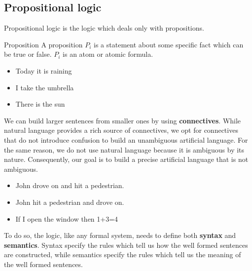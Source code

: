 \documentclass{article}
\begin{document}
\subsection{Propositional logic}
Propositional logic is the logic which deals only with propositions.
\begin{Definition}{Proposition}{}
    A proposition $P_i$ is a statement about some specific fact which can be true or
    false. $P_{i}$ is an atom or atomic formula.
\end{Definition}
\begin{example}
   \begin{itemize}
       \item Today it is raining
       \item I take the umbrella
       \item There is the sun
   \end{itemize}
\end{example}
We can build larger sentences from smaller ones by using \textbf{connectives}.
While natural language provides a rich source of connectives, we opt for
connectives that do not introduce confusion to build an unambiguous artificial
language. For the same reason, we do not use natural language because it is
ambiguous by its nature. Consequently, our goal is to build a precise
artificial language that is not ambiguous.
\begin{example}
    \begin{itemize}
        \item John drove on and hit a pedestrian.
        \item John hit a pedestrian and drove on.
        \item If I open the window then 1+3=4
    \end{itemize}
\end{example}
To do so, the logic, like any formal system, needs to define both
\textbf{syntax} and \textbf{semantics}. Syntax specify the rules which tell us
how the well formed sentences are constructed, while semantics specify the
rules which tell us the meaning of the well formed sentences.
\end{document}
